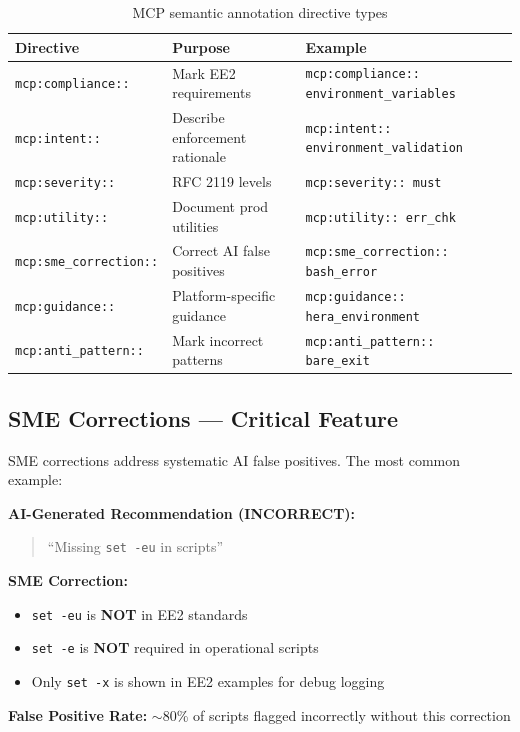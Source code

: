 \documentclass[11pt,letterpaper,twoside]{article}
\newcommand{\checkmark}{\ding{51}}
\newcommand{\crossmark}{\ding{55}}
\begin{document}
\begin{table}[H]
\centering
\renewcommand{\arraystretch}{1.3}
\begin{tabularx}{\textwidth}{l|l|X}
\toprule
\textbf{Directive} & \textbf{Purpose} & \textbf{Example} \\
\midrule
\texttt{mcp:compliance::} & Mark EE2 requirements & \texttt{mcp:compliance:: environment\_variables} \\
\texttt{mcp:intent::} & Describe enforcement rationale & \texttt{mcp:intent:: environment\_validation} \\
\texttt{mcp:severity::} & RFC 2119 levels & \texttt{mcp:severity:: must} \\
\texttt{mcp:utility::} & Document prod utilities & \texttt{mcp:utility:: err\_chk} \\
\texttt{mcp:sme\_correction::} & Correct AI false positives & \texttt{mcp:sme\_correction:: bash\_error} \\
\texttt{mcp:guidance::} & Platform-specific guidance & \texttt{mcp:guidance:: hera\_environment} \\
\texttt{mcp:anti\_pattern::} & Mark incorrect patterns & \texttt{mcp:anti\_pattern:: bare\_exit} \\
\bottomrule
\end{tabularx}
\caption{MCP semantic annotation directive types}
\end{table}

\subsection{SME Corrections — Critical Feature}

\begin{warningbox}
SME corrections address systematic AI false positives. The most common example:

\textbf{AI-Generated Recommendation (INCORRECT):}
\begin{quote}
\textcolor{red}{\crossmark} ``Missing \texttt{set -eu} in scripts''
\end{quote}

\textbf{SME Correction:}
\begin{itemize}[leftmargin=1.5em]
    \item \textcolor{red}{\crossmark} \texttt{set -eu} is \textbf{NOT} in EE2 standards
    \item \textcolor{red}{\crossmark} \texttt{set -e} is \textbf{NOT} required in operational scripts
    \item \textcolor{chromagreen}{\checkmark} Only \texttt{set -x} is shown in EE2 examples for debug logging
\end{itemize}

\textbf{False Positive Rate:} $\sim$80\% of scripts flagged incorrectly without this correction
\end{warningbox}
\end{document}

